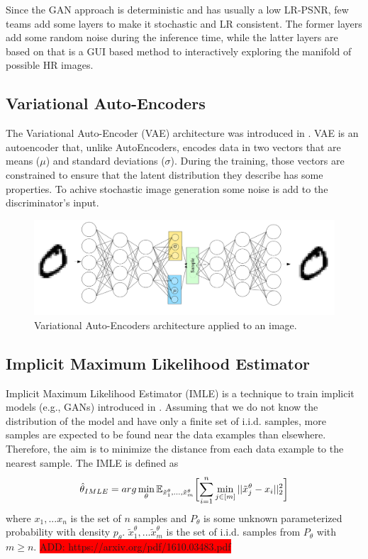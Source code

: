 \documentclass{article}
\begin{document}
Since the GAN approach is deterministic and has usually a low LR-PSNR, few teams add some layers to make it stochastic and LR consistent. The former layers add some random noise during the inference time, while the latter layers are based on \cite{esp} that is a GUI based method to interactively exploring the manifold of possible HR images. 

\subsection{Variational Auto-Encoders}
The Variational Auto-Encoder (VAE) architecture was introduced in \cite{vae}. VAE is an autoencoder that, unlike AutoEncoders, encodes data in two vectors that are means ($\mu$) and standard deviations ($\sigma$). During the training, those vectors are constrained to ensure that the latent distribution they describe has some properties. To achive stochastic image generation some noise is add to the discriminator's input.

\begin{figure}[h]
    \centering
    \includegraphics[scale=.3]{vae.png}
    \caption{Variational Auto-Encoders architecture applied to an image.}
    \label{img:vae}
\end{figure}



\subsection{Implicit Maximum Likelihood Estimator}
Implicit Maximum Likelihood Estimator (IMLE) is a technique to train implicit models (e.g., GANs) introduced in \cite{imle}. Assuming that we do not know the distribution of the model and have only a finite set of i.i.d. samples, more samples are expected to be found near the data examples than elsewhere. Therefore, the aim is to minimize the distance from each data example to the nearest sample. The IMLE is defined as
\begin{equation}
    \hat{\theta}_{IMLE} = \normalfont{arg} \min_{\theta} \mathbb{E}_{\tilde{x}_1^{\theta}, ..., \tilde{x}_m^{\theta}} \biggl[ \sum^n _{i=1} \min_{j \in [m]} ||\tilde{x}_j^{\theta}-x_i||_2^2\biggr]
\end{equation}
where $x_1, ... x_n$ is the set of $n$ samples and $P_\theta$ is some unknown parameterized probability with density $p_\theta$. $\tilde{x}_1^\theta, ... \tilde{x}^\theta_m$ is the set of i.i.d. samples from $P_\theta$ with $m \geq n$.
\colorbox{red}{ADD: https://arxiv.org/pdf/1610.03483.pdf}
\end{document}

